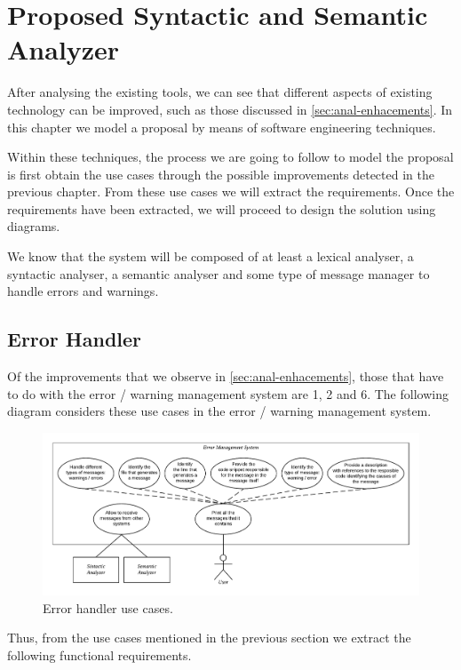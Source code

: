 \chapter{Proposed Syntactic and Semantic Analyzer}
\label{ch:proposed-sin-sema-anal}
After analysing the existing tools, we can see that different
aspects of existing technology can be improved, such as those
discussed in \cref{sec:anal-enhacements}. In this chapter we
model a proposal by means of software engineering techniques.

Within these techniques, the process we are going to follow
to model the proposal is first obtain the use cases through
the possible improvements detected in the previous chapter.
From these use cases we will extract the requirements. Once
the requirements have been extracted, we will proceed to
design the solution using diagrams.

We know that the system will be composed of at least a lexical
analyser, a syntactic analyser, a semantic analyser and some
type of message manager to handle errors and warnings.

\section{Error Handler}
Of the improvements that we observe in \cref{sec:anal-enhacements}, those
that have to do with the error / warning management
system are 1, 2 and 6. The following diagram considers
these use cases in the error / warning management system.

\begin{figure}[h!]
    \includegraphics[scale=0.6]{images/err-hand-use-case.pdf}
    \centering
    \caption[Error handler use cases]{Error handler use cases.}
    \label{fig:err-hand-use-case}
\end{figure}

Thus, from the use cases mentioned in the previous section we
extract the following functional requirements.

